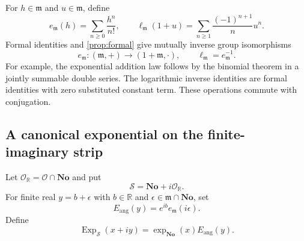 \documentclass[11pt,letterpaper]{article}
\numberwithin{equation}{section}
\theoremstyle{definition}
\theoremstyle{remark}
\newcommand{\No}{\mathbf{No}}
\newcommand{\R}{\mathbb{R}}
\newcommand{\OO}{\mathcal{O}}
\newcommand{\mm}{\mathfrak{m}}
\newcommand{\Exp}{\operatorname{Exp}}
\begin{document}
For $h\in\mm$ and $u\in\mm$, define
\begin{equation}\label{eq:small-exp-log}
 e_{\mm}(h)=\sum_{n\ge0}\frac{h^n}{n!},\qquad
 \ell_{\mm}(1+u)=\sum_{n\ge1}\frac{(-1)^{n+1}}n u^n.
\end{equation}
Formal identities and \cref{prop:formal} give mutually inverse group
isomorphisms
\[
 e_{\mm}:(\mm,+)\longrightarrow(1+\mm,\cdot),
 \qquad \ell_{\mm}=e_{\mm}^{-1}.
\]
For example, the exponential addition law follows by the binomial theorem in
a jointly summable double series. The logarithmic inverse identities are
formal identities with zero substituted constant term. These operations
commute with conjugation.

\subsection{A canonical exponential on the finite-imaginary strip}

Let $\OO_\R=\OO\cap\No$ and put
\[
 \mathcal S=\No+i\OO_\R.
\]
For finite real $y=b+\epsilon$ with $b\in\R$ and
$\epsilon\in\mm\cap\No$, set
\[
 E_{\mathrm{ang}}(y)=e^{ib}e_{\mm}(i\epsilon).
\]
Define
\begin{equation}\label{eq:stripexp}
 \Exp_{\mathcal S}(x+iy)=\exp_{\No}(x)E_{\mathrm{ang}}(y).
\end{equation}
\end{document}
